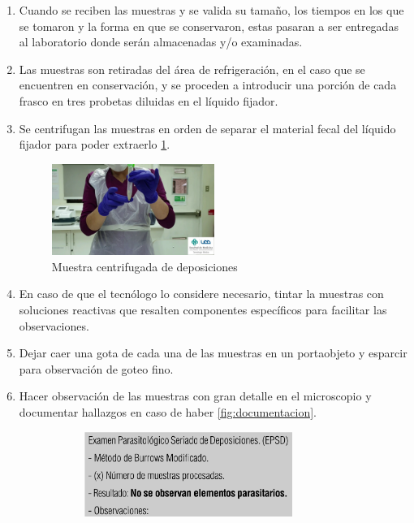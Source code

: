 \documentclass[letter,12pt]{report}
\begin{document}
\begin{enumerate}
    \item Cuando se reciben las muestras y se valida su tamaño, los tiempos en los que se
        tomaron y la forma en que se conservaron, estas pasaran a ser entregadas al
        laboratorio donde serán almacenadas y/o examinadas.
    \item Las muestras son retiradas del área de refrigeración, en el caso que se
        encuentren en conservación, y se proceden a introducir una porción de cada frasco
        en tres probetas diluidas en el líquido fijador.
    \item Se centrifugan las muestras en orden de separar el material fecal del líquido
        fijador para poder extraerlo \ref{fig:sample}.
        \begin{figure}[H]
            \centering
            \includegraphics[width=0.5\textwidth]{sample}
            \caption{Muestra centrifugada de deposiciones}
            \label{fig:sample}
        \end{figure}
    \item En caso de que el tecnólogo lo considere necesario, tintar la muestras con
        soluciones reactivas que resalten componentes específicos para facilitar las
        observaciones.
    \item Dejar caer una gota de cada una de las muestras en un portaobjeto y esparcir
        para observación de goteo fino.
    \item Hacer observación de las muestras con gran detalle en el microscopio y
        documentar hallazgos en caso de haber \ref{fig:documentacion}.
        \begin{figure}[H]
            \begin{subfigure}{0.5\textwidth}
                \centering
                \includegraphics[width=0.8\textwidth]{negativo}

\end{subfigure}
\end{figure}
\end{enumerate}
\end{document}
